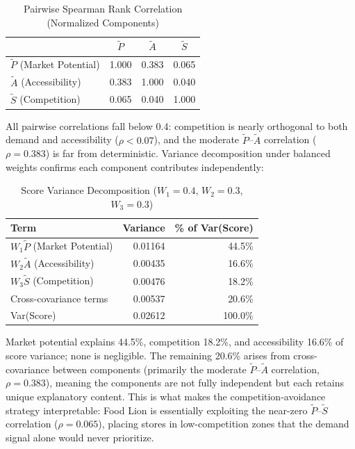 \documentclass[conference]{IEEEtran}
\begin{document}
\begin{table}[!t]
\centering
\caption{Pairwise Spearman Rank Correlation (Normalized Components)}
\label{tab:correlation}
\begin{tabular}{lccc}
\toprule
& $\widetilde{P}$ & $\widetilde{A}$ & $\widetilde{S}$ \\
\midrule
$\widetilde{P}$ (Market Potential) & 1.000 & 0.383 & 0.065 \\
$\widetilde{A}$ (Accessibility)    & 0.383 & 1.000 & 0.040 \\
$\widetilde{S}$ (Competition)      & 0.065 & 0.040 & 1.000 \\
\bottomrule
\end{tabular}
\end{table}

All pairwise correlations fall below 0.4: competition is nearly
orthogonal to both demand and accessibility ($\rho < 0.07$), and the
moderate $\widetilde{P}$--$\widetilde{A}$ correlation ($\rho = 0.383$)
is far from deterministic. Variance decomposition under balanced
weights confirms each component contributes independently:

\begin{table}[!t]
\centering
\caption{Score Variance Decomposition
         ($W_1 = 0.4$, $W_2 = 0.3$, $W_3 = 0.3$)}
\label{tab:variance}
\begin{tabular}{lrr}
\toprule
\textbf{Term} & \textbf{Variance}
              & \textbf{\% of Var(Score)} \\
\midrule
$W_1 \widetilde{P}$ (Market Potential) & 0.01164 & 44.5\% \\
$W_2 \widetilde{A}$ (Accessibility)    & 0.00435 & 16.6\% \\
$W_3 \widetilde{S}$ (Competition)      & 0.00476 & 18.2\% \\
Cross-covariance terms                 & 0.00537 & 20.6\% \\
\midrule
Var(Score)                             & 0.02612 & 100.0\% \\
\bottomrule
\end{tabular}
\end{table}

Market potential explains 44.5\%, competition 18.2\%, and
accessibility 16.6\% of score variance; none is negligible. The
remaining 20.6\% arises from cross-covariance between components
(primarily the moderate $\widetilde{P}$--$\widetilde{A}$ correlation,
$\rho = 0.383$), meaning the components are not fully independent
but each retains unique explanatory content. This is what makes the
competition-avoidance strategy interpretable: Food Lion is
essentially exploiting the near-zero $\widetilde{P}$--$\widetilde{S}$
correlation ($\rho = 0.065$), placing stores in low-competition zones
that the demand signal alone would never prioritize.
\end{document}
